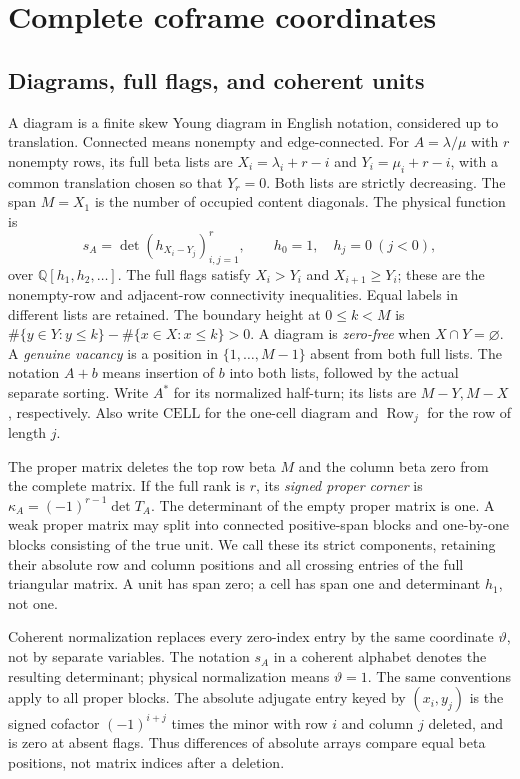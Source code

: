 \documentclass[11pt,a4paper]{amsart}
\numberwithin{equation}{section}
\theoremstyle{plain}
\theoremstyle{definition}
\newcommand{\Q}{\mathbb Q}
\newcommand{\Row}{\operatorname{Row}}
\begin{document}
\section{Complete coframe coordinates}\label{sec:coframe-coordinates}

\subsection{Diagrams, full flags, and coherent units}

A diagram is a finite skew Young diagram in English notation, considered
up to translation.  Connected means nonempty and edge-connected.
For \(A=\lambda/\mu\) with \(r\) nonempty rows, its full beta lists are
\(X_i=\lambda_i+r-i\) and \(Y_i=\mu_i+r-i\), with a common translation
chosen so that \(Y_r=0\).  Both lists are strictly decreasing.
The span \(M=X_1\) is the number of occupied content diagonals.
The physical function is
\[
 s_A=\det(h_{X_i-Y_j})_{i,j=1}^r,
 \qquad h_0=1,\quad h_j=0\ (j<0),
\]
over \(\Q[h_1,h_2,\ldots]\).  The full flags satisfy
\(X_i>Y_i\) and \(X_{i+1}\ge Y_i\); these are the nonempty-row and
adjacent-row connectivity inequalities.  Equal labels in different
lists are retained.  The boundary height at \(0\le k<M\) is
\(\#\{y\in Y:y\le k\}-\#\{x\in X:x\le k\}>0\).
A diagram is \emph{zero-free} when \(X\cap Y=\varnothing\).
A \emph{genuine vacancy} is a position in \(\{1,\ldots,M-1\}\)
absent from both full lists.  The notation \(A+b\) means insertion
of \(b\) into both lists, followed by the actual separate sorting.
Write \(A^*\) for its normalized half-turn; its lists are
\(M-Y,M-X\), respectively.  Also write \(\mathrm{CELL}\) for the
one-cell diagram and \(\Row_j\) for the row of length \(j\).

The proper matrix deletes the top row beta \(M\) and the column beta
zero from the complete matrix.  If the full rank is \(r\), its
\emph{signed proper corner} is \(\kappa_A=(-1)^{r-1}\det T_A\).
The determinant of the empty proper matrix is one.  A weak proper
matrix may split into connected positive-span blocks and one-by-one
blocks consisting of the true unit.  We call these its strict
components, retaining their absolute row and column positions and all
crossing entries of the full triangular matrix.  A unit has span zero;
a cell has span one and determinant \(h_1\), not one.

Coherent normalization replaces every zero-index entry by the same
coordinate \(\vartheta\), not by separate variables.  The notation
\(s_A\) in a coherent alphabet denotes the resulting determinant;
physical normalization means \(\vartheta=1\).  The same conventions
apply to all proper blocks.  The absolute adjugate entry keyed by
\((x_i,y_j)\) is the signed cofactor \((-1)^{i+j}\) times the minor
with row \(i\) and column \(j\) deleted, and is zero at absent flags.
Thus differences of absolute arrays compare equal beta positions,
not matrix indices after a deletion.
\end{document}
